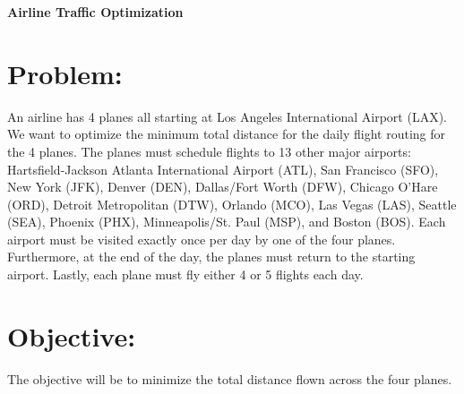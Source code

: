\documentclass[12pt]{extarticle}
\begin{document}
\begin{center}
\textbf{Airline Traffic Optimization}
\end{center}
\section*{\small Problem:}
\hspace{1cm}
An airline has 4 planes all starting at Los Angeles International Airport (LAX). We want to optimize the minimum total distance for the daily flight routing for the 4 planes. The planes must schedule flights to 13 other major airports: Hartsfield-Jackson Atlanta International Airport (ATL), San Francisco (SFO), New York (JFK), Denver (DEN), Dallas/Fort Worth (DFW), Chicago O'Hare (ORD), Detroit Metropolitan (DTW), Orlando (MCO), Las Vegas (LAS), Seattle (SEA), Phoenix (PHX), Minneapolis/St. Paul (MSP), and Boston (BOS). Each airport must be visited exactly once per day by one of the four planes. Furthermore, at the end of the day, the planes must return to the starting airport. Lastly, each plane must fly either 4 or 5 flights each day.

\section*{\small Objective:}
\hspace{1cm} The objective will be to minimize the total distance flown across the four planes.
\end{document}
